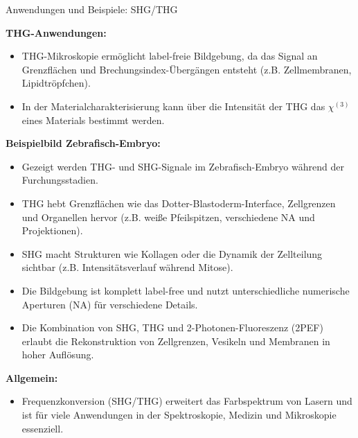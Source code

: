 \documentclass[aspectratio=169]{beamer} %
\begin{document}
\begin{frame}{Anwendungen und Beispiele: SHG/THG}
{\begin{itemize}
    \end{itemize}
    \textbf{THG-Anwendungen:}
    \begin{itemize}
      \item THG-Mikroskopie ermöglicht label-freie Bildgebung, da das Signal an Grenzflächen und Brechungsindex-Übergängen entsteht (z.B. Zellmembranen, Lipidtröpfchen).
      \item In der Materialcharakterisierung kann über die Intensität der THG das $\chi^{(3)}$ eines Materials bestimmt werden.
    \end{itemize}
    \textbf{Beispielbild Zebrafisch-Embryo:}
    \begin{itemize}
      \item Gezeigt werden THG- und SHG-Signale im Zebrafisch-Embryo während der Furchungsstadien.
      \item THG hebt Grenzflächen wie das Dotter-Blastoderm-Interface, Zellgrenzen und Organellen hervor (z.B. weiße Pfeilspitzen, verschiedene NA und Projektionen).
      \item SHG macht Strukturen wie Kollagen oder die Dynamik der Zellteilung sichtbar (z.B. Intensitätsverlauf während Mitose).
      \item Die Bildgebung ist komplett label-free und nutzt unterschiedliche numerische Aperturen (NA) für verschiedene Details.
      \item Die Kombination von SHG, THG und 2-Photonen-Fluoreszenz (2PEF) erlaubt die Rekonstruktion von Zellgrenzen, Vesikeln und Membranen in hoher Auflösung.
    \end{itemize}
    \textbf{Allgemein:}
    \begin{itemize}
      \item Frequenzkonversion (SHG/THG) erweitert das Farbspektrum von Lasern und ist für viele Anwendungen in der Spektroskopie, Medizin und Mikroskopie essenziell.
    \end{itemize}
  }
\end{frame}

\end{document}
